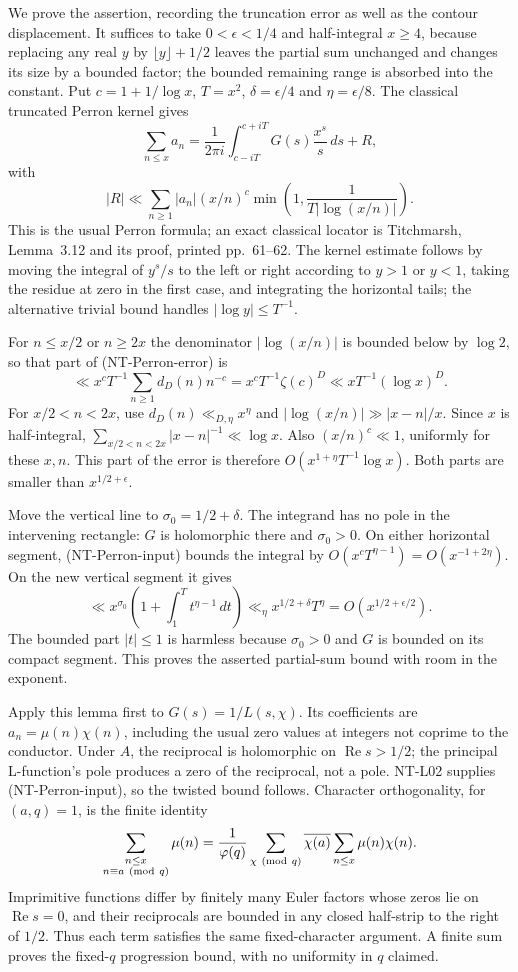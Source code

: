We prove the assertion, recording the truncation error as well as the
contour displacement.  It suffices to take $0<\epsilon<1/4$ and
half-integral $x\ge4$, because replacing any real $y$ by
$\lfloor y\rfloor+1/2$ leaves the partial sum unchanged and changes its
size by a bounded factor; the bounded remaining range is absorbed into
the constant.  Put
$c=1+1/\log x$, $T=x^2$, $\delta=\epsilon/4$ and
$\eta=\epsilon/8$.  The classical truncated Perron kernel gives
\[
 \sum_{n\le x}a_n=
 \frac1{2\pi i}\int_{c-iT}^{c+iT}G(s)\frac{x^s}{s}\,ds+R,
\]
with
\[
 |R|\ll\sum_{n\ge1}|a_n|(x/n)^c
           \min\left(1,\frac1{T|\log(x/n)|}\right).
\tag{NT-Perron-error}
\]
This is the usual Perron formula; an exact classical locator is
Titchmarsh, Lemma~3.12 and its proof, printed pp.~61--62.  The kernel
estimate follows by moving the integral of $y^s/s$ to the left or right
according to $y>1$ or $y<1$, taking the residue at zero in the first
case, and integrating the horizontal tails; the alternative trivial
bound handles $|\log y|\le T^{-1}$.

For $n\le x/2$ or $n\ge2x$ the denominator $|\log(x/n)|$ is bounded
below by $\log2$, so that part of (NT-Perron-error) is
\[
 \ll x^cT^{-1}\sum_{n\ge1}d_D(n)n^{-c}
 =x^cT^{-1}\zeta(c)^D\ll xT^{-1}(\log x)^D.
\]
For $x/2<n<2x$, use $d_D(n)\ll_{D,\eta}x^\eta$ and
$|\log(x/n)|\gg |x-n|/x$.  Since $x$ is half-integral,
$\sum_{x/2<n<2x}|x-n|^{-1}\ll\log x$.  Also $(x/n)^c\ll1$,
uniformly for these $x,n$.  This part of the error is therefore
$O(x^{1+\eta}T^{-1}\log x)$.  Both parts are smaller than
$x^{1/2+\epsilon}$.

Move the vertical line to $\sigma_0=1/2+\delta$.  The integrand has no
pole in the intervening rectangle: $G$ is holomorphic there and
$\sigma_0>0$.  On either horizontal segment,
(NT-Perron-input) bounds the integral by
$O(x^cT^{\eta-1})=O(x^{-1+2\eta})$.
On the new vertical segment it gives
\[
 \ll x^{\sigma_0}\left(1+\int_1^Tt^{\eta-1}\,dt\right)
 \ll_\eta x^{1/2+\delta}T^\eta
 =O(x^{1/2+\epsilon/2}).
\]
The bounded part $|t|\le1$ is harmless because $\sigma_0>0$ and $G$
is bounded on its compact segment.  This proves the asserted partial-sum
bound with room in the exponent.

Apply this lemma first to $G(s)=1/L(s,\chi)$.
Its coefficients are $a_n=\mu(n)\chi(n)$, including the usual zero
values at integers not coprime to the conductor.  Under $A$, the
reciprocal is holomorphic on $\operatorname{Re}s>1/2$; the principal
L-function's pole produces a zero of the reciprocal, not a pole.
NT-L02 supplies (NT-Perron-input), so the twisted bound follows.
Character orthogonality, for $(a,q)=1$, is the finite identity
\[
 \sum_{\substack{n\le x\\n\equiv a\ ({\rm mod}\ q)}}\mu(n)
 =\frac1{\varphi(q)}\sum_{\chi\ ({\rm mod}\ q)}
       \overline{\chi(a)}\sum_{n\le x}\mu(n)\chi(n).
\]
Imprimitive functions differ by finitely many Euler factors whose zeros
lie on $\operatorname{Re}s=0$, and their reciprocals are bounded in any
closed half-strip to the right of $1/2$.  Thus each term satisfies the
same fixed-character argument.  A finite sum proves the fixed-$q$
progression bound, with no uniformity in $q$ claimed.

